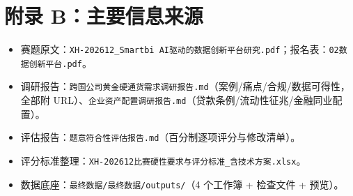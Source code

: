 \documentclass[UTF8,12pt]{ctexart}
\begin{document}
\section{附录 B：主要信息来源}

\begin{itemize}
\item 赛题原文：\texttt{XH-202612\_Smartbi AI驱动的数据创新平台研究.pdf}；报名表：\texttt{02数据创新平台.pdf}。
\item 调研报告：\texttt{跨国公司黄金硬通货需求调研报告.md}（案例/痛点/合规/数据可得性，全部附 URL）、\texttt{企业资产配置调研报告.md}（贷款条例/流动性征兆/金融同业配置）。
\item 评估报告：\texttt{题意符合性评估报告.md}（百分制逐项评分与修改清单）。
\item 评分标准整理：\texttt{XH-202612比赛硬性要求与评分标准\_含技术方案.xlsx}。
\item 数据底座：\texttt{最终数据/最终数据/outputs/}（4 个工作簿 + 检查文件 + 预览）。
\end{itemize}
\end{document}
